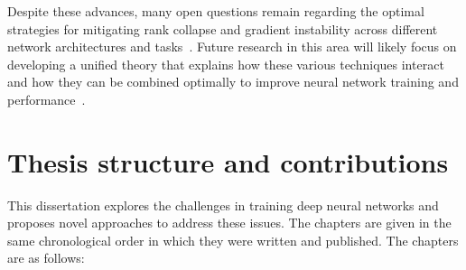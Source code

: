 Despite these advances, many open questions remain regarding the optimal strategies for mitigating rank collapse and gradient instability across different network architectures and tasks~\cite{hanin2018start,yang2018a}. Future research in this area will likely focus on developing a unified theory that explains how these various techniques interact and how they can be combined optimally to improve neural network training and performance~\cite{pennington2018emergence,yang2020tensor}. 






\section{Thesis structure and contributions}
This dissertation explores the challenges in training deep neural networks and proposes novel approaches to address these issues. The chapters are given in the same chronological order in which they were written and published. The chapters are as follows:


